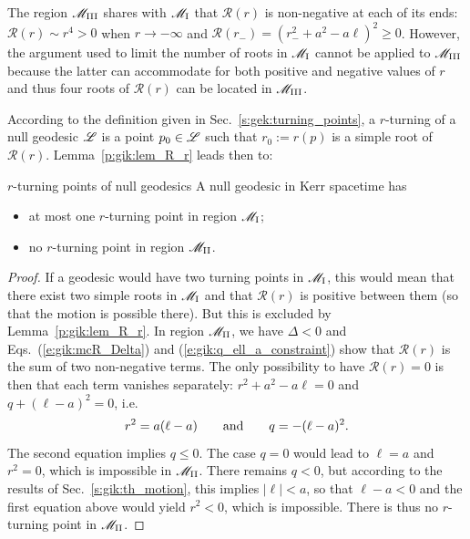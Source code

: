 \begin{remark} \label{r:gik:R_zero_M_III}
The region $\mathscr{M}_{\rm III}$ shares with $\mathscr{M}_{\rm I}$ that $\mathcal{R}(r)$ is
non-negative at each of its ends: $\mathcal{R}(r) \sim r^4 > 0$ when $r\to -\infty$
and $\mathcal{R}(r_-) = (r_-^2 + a^2 - a \ell)^2 \geq 0$. However, the argument
used to limit the number of roots in $\mathscr{M}_{\rm I}$
cannot be applied to $\mathscr{M}_{\rm III}$ because the latter can accommodate for both positive and negative
values of $r$ and thus four roots of $\mathcal{R}(r)$ can be located in $\mathscr{M}_{\rm III}$.
\end{remark}


According to the definition given in Sec.~\ref{s:gek:turning_points},
a $r$-turning of a null geodesic $\mathscr{L}$ is a point $p_0\in \mathscr{L}$
such that $r_0 := r(p)$ is a simple root of $\mathcal{R}(r)$.
Lemma~\ref{p:gik:lem_R_r} leads then to:
\begin{tprop}{$r$-turning points of null geodesics}{}
A null geodesic in Kerr spacetime has
\begin{itemize}
\item at most one $r$-turning point in region $\mathscr{M}_{\rm I}$;
\item no $r$-turning point in region $\mathscr{M}_{\rm II}$.
\end{itemize}
\end{tprop}

\begin{proof}
If a geodesic would have two turning points in $\mathscr{M}_{\rm I}$, this would mean
that there exist two simple roots in $\mathscr{M}_{\rm I}$ and that
$\mathcal{R}(r)$ is positive between them (so that the motion is possible
there). But this is excluded by Lemma~\ref{p:gik:lem_R_r}.
In region $\mathscr{M}_{\rm II}$, we have $\Delta < 0$ and
Eqs.~(\ref{e:gik:mcR_Delta}) and (\ref{e:gik:q_ell_a_constraint}) show that
$\mathcal{R}(r)$ is the sum of two non-negative terms. The only possibility
to have $\mathcal{R}(r)=0$ is then that each term vanishes separately:
$r^2 + a^2 - a\ell = 0$ and $q + (\ell -a)^2 = 0$, i.e.
\[
  r^2 = a (\ell - a) \qquad\mbox{and}\qquad q = - (\ell - a)^2 .
\]
The second equation implies $q\leq 0$. The case $q=0$ would lead to $\ell = a$ and $r^2 = 0$,
which is impossible in $\mathscr{M}_{\rm II}$. There remains $q < 0$, but
according to the results of Sec.~\ref{s:gik:th_motion}, this implies $|\ell| < a$, so
that $\ell - a < 0$ and the first equation above would yield $r^2 < 0$, which is impossible.
There is thus no $r$-turning point in $\mathscr{M}_{\rm II}$.
\end{proof}

